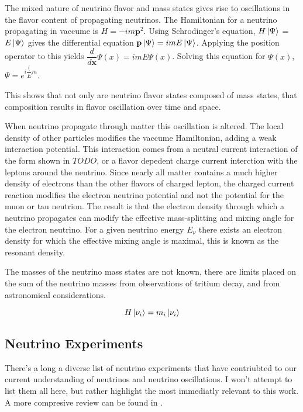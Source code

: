 The mixed nature of neutrino flavor and mass states gives rise to oscillations
in the flavor content of propagating neutrinos.
The Hamiltonian for a neutrino propagating in vaccume is
$H = -im\textbf{p}^2 $.
Using Schrodinger's equation,
$H\ket{\Psi}$ = $E\ket{\Psi}$
gives the differential equation
$\textbf{p} \ket{\Psi} = imE\ket{\Psi}$.
Applying the position operator to this yields
$\dfrac{d}{d\textbf{x}} \Psi(x) = imE\Psi(x)$.
Solving this equation for $\Psi(x)$,
$\Psi = e^{i\dfrac({E}{m}}$.

This shows that not only are neutrino flavor states
composed of mass states, that composition results
in flavor oscillation over time and space.

When neutrino propagate through matter this oscillation is altered.
The local density of other particles modifies the vaccume Hamiltonian,
adding a weak interaction potential.
This interaction comes from a neutral current interaction of the form
shown in $TODO$, or a flavor depedent charge current interction with the
leptons around the neutrino.
Since nearly all matter contains a much higher density of electrons
than the other flavors of charged lepton, the charged current reaction
modifies the electron neutrino potential and not the potential for the muon
or tau neutrion.
The result is that the electron density through which a neutrino propagates
can modify the effective mass-splitting and mixing angle for the electron
neutrino.
For a given neutrino energy $E_{\nu}$ there exists an electron density for which
the effective mixing angle is maximal, this is known as the resonant density.

The masses of the neutrino mass states are not known, there are limits placed
on the sum of the neutrino masses from observations of tritium decay, and
from astronomical considerations. %


\begin{equation}
    H \ket{\nu_i} = m_i \ket{\nu_i}
\end{equation}


\subsection{Neutrino Experiments}
There's a long a diverse list of neutrino experiments that have contriubted to
our current understanding of neutrinos and neutrino oscillations.
I won't attempt to list them all here, but rather highlight the most immediatly
relevant to this work. A more compresive review can be found in \citep{FINDAREVIEW}.

